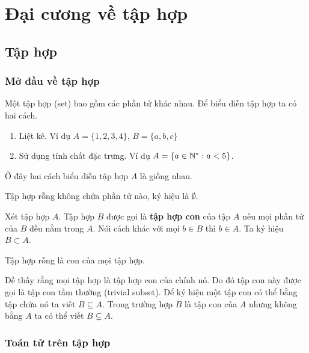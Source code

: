 \chapter{Đại cương về tập hợp}

\section{Tập hợp}

\subsection*{Mở đầu về tập hợp}

Một tập hợp (set) bao gồm các phần tử khác nhau. Để biểu diễn tập hợp
ta có hai cách.

\begin{enumerate}
    \item Liệt kê. Ví dụ $A = \{ 1, 2, 3, 4 \}$, $B = \{ a, b , c \}$
    \item Sử dụng tính chất đặc trưng. Ví dụ $A = \{ a \in \mathbb{N}^* : a < 5 \}$.
\end{enumerate}

Ở đây hai cách biểu diễn tập hợp $A$ là giống nhau.

\begin{definition}
    Tập hợp rỗng không chứa phần tử nào, ký hiệu là $\emptyset$.
\end{definition}

\begin{definition}
    Xét tập hợp $A$. Tập hợp $B$ được gọi là \textbf{tập hợp con} của tập $A$
    nếu mọi phần tử của $B$ đều nằm trong $A$. Nói cách khác với mọi $b \in B$ thì
    $b \in A$. Ta ký hiệu $B \subset A$.
\end{definition}

\begin{remark}
    Tập hợp rỗng là con của mọi tập hợp.
\end{remark}

Dễ thấy rằng mọi tập hợp là tập hợp con của chính nó. Do đó tập con này được gọi là
tập con tầm thường (trivial subset). Để ký hiệu một tập con có thể bằng tập chứa nó
ta viết $B \subseteq A$. Trong trường hợp $B$ là tập con của $A$ nhưng không bằng 
$A$ ta có thể viết $B \subsetneq A$.

\subsection*{Toán tử trên tập hợp}

